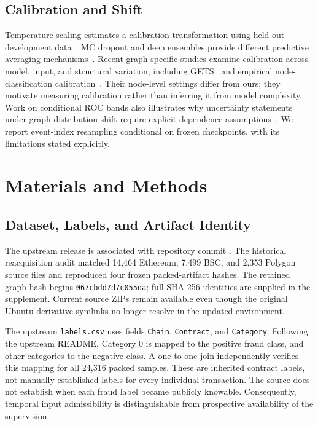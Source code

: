 \documentclass[applsci,article,submit,pdftex,moreauthors]{Definitions/mdpi}
\begin{document}
\subsection{Calibration and Shift}
Temperature scaling estimates a calibration transformation using held-out development data~\cite{guo2017calibration}. MC dropout and deep ensembles provide different predictive averaging mechanisms~\cite{gal2016dropout,lakshminarayanan2017deepensemble}. Recent graph-specific studies examine calibration across model, input, and structural variation, including GETS~\cite{zhuang2025gets} and empirical node-classification calibration~\cite{vos2024calibration}. Their node-level settings differ from ours; they motivate measuring calibration rather than inferring it from model complexity. Work on conditional ROC bands also illustrates why uncertainty statements under graph distribution shift require explicit dependence assumptions~\cite{wu2025cproc}. We report event-index resampling conditional on frozen checkpoints, with its limitations stated explicitly.

\section{Materials and Methods}
\subsection{Dataset, Labels, and Artifact Identity}
The upstream release is associated with repository commit \texttt{}. The historical reacquisition audit matched 14,464 Ethereum, 7,499 BSC, and 2,353 Polygon source files and reproduced four frozen packed-artifact hashes. The retained graph hash begins \texttt{067cbdd7d7c055da}; full SHA-256 identities are supplied in the supplement. Current source ZIPs remain available even though the original Ubuntu derivative symlinks no longer resolve in the updated environment.

The upstream \texttt{labels.csv} uses fields \texttt{Chain}, \texttt{Contract}, and \texttt{Category}. Following the upstream README, Category 0 is mapped to the positive fraud class, and other categories to the negative class. A one-to-one join independently verifies this mapping for all 24,316 packed samples. These are inherited contract labels, not manually established labels for every individual transaction. The source does not establish when each fraud label became publicly knowable. Consequently, temporal input admissibility is distinguishable from prospective availability of the supervision.
\end{document}
